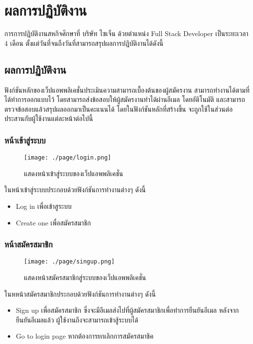 \chapter{ผลการปฏิบัติงาน}
\label{chapter:result}

การการปฏิบัติงานสหกิจศึกษาที่ บริษัท ไซเจ็น ด้วยตำแหน่ง Full Stack Developer เป็นระยะเวลา 4 เดือน ตั้งแต่วันที่\StartDWork  จนถืงวันที่\EndDWork สามารถสรุปผลการปฏิบัติงานได้ดังนี้

\section{ผลการปฏิบัติงาน}

ฟังก์ชันหลักของเว็ปแอพพลิเคชั่นประเมินความสามารถเบื้องต้นของผู้สมัครงาน สามารถทำงานได้ตามที่ได้ทำการออกแบบไว้ โดยสามารถส่งข้อสอบให้ผู้สมัครงานทำได้ผ่านอีเมล โดยอัติโนมัติ และสามารถตรวจข้อสอบแล้วสรุปผลออกมาเป็นคะแนนได้
โดยในฟังก์ชันหลักที่สร้างขึ้น จะถูกใช้ในส่วนต่อประสานกับผู้ใช้งานแต่ละหน้าต่อไปนี้

\subsection{หน้าเข้าสู่ระบบ}
\begin{figure}[H]
  \centering
  \texttt{[image: ./page/login.png]}
  \caption{แสดงหน้าเข้าสู่ระบบของเว็ปแอพพลิเคชั่น}
  \label{Fig:Login}
\end{figure}
ในหน้าเข้าสู่ระบบประกอบด้วยฟังก์ชันการทำงานต่างๆ ดังนี้
\begin{itemize}
  \item Log in เพื่อเข้าสูระบบ
  \item Create one เพื่อสมัครสมาชิก
\end{itemize}

\subsection{หน้าสมัครสมาชิก}
\begin{figure}[H]
  \centering
  \texttt{[image: ./page/singup.png]}
  \caption{แสดงหน้าสมัครสมาชิกสู่ระบบของเว็ปแอพพลิเคชั่น}
  \label{Fig:Register}
\end{figure}
ในหหน้าสมัครสมาชิกประกอบด้วยฟังก์ชันการทำงานต่างๆ ดังนี้
\begin{itemize}
  \item Sign up เพื่อสมัครสมาชิก ซึ่งจะมีอีเมลส่งไปที่ผู้สมัครสมาชิกเพื่อทำการยืนยันอีเมล หลังจากยืนยันอีเมลแล้ว ผู้ใช้งานถึงจะสามารถเข้าสู้ระบบได้
  \item Go to login page หากต้องการยกเลิกการสมัครสมาชิค
\end{itemize}

